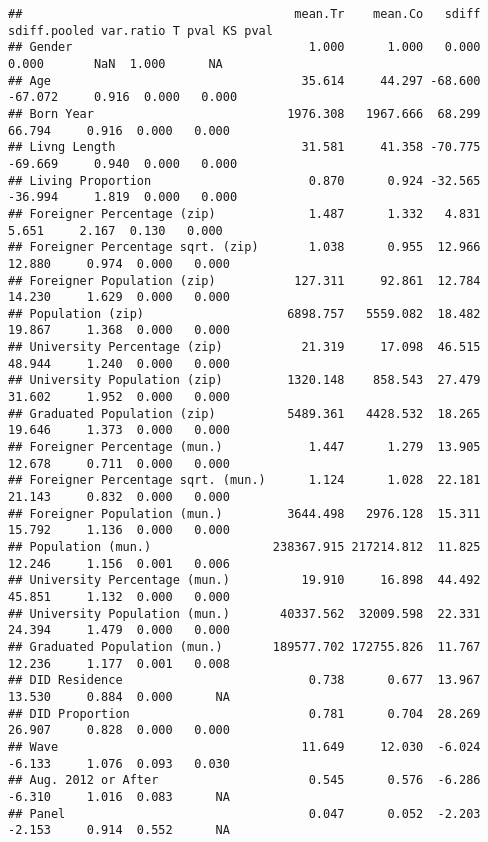 \documentclass[
]{article}
\newenvironment{Shaded}{\begin{snugshade}}{\end{snugshade}}
\newcommand{\CommentTok}[1]{\textcolor[rgb]{0.56,0.35,0.01}{\textit{#1}}}
\newcommand{\DecValTok}[1]{\textcolor[rgb]{0.00,0.00,0.81}{#1}}
\newcommand{\KeywordTok}[1]{\textcolor[rgb]{0.13,0.29,0.53}{\textbf{#1}}}
\newcommand{\NormalTok}[1]{#1}
\newcommand{\OperatorTok}[1]{\textcolor[rgb]{0.81,0.36,0.00}{\textbf{#1}}}
\newcommand{\StringTok}[1]{\textcolor[rgb]{0.31,0.60,0.02}{#1}}
\begin{document}
\begin{Shaded}
\end{Shaded}

\begin{verbatim}
##                                      mean.Tr    mean.Co   sdiff sdiff.pooled var.ratio T pval KS pval
## Gender                                 1.000      1.000   0.000        0.000       NaN  1.000      NA
## Age                                   35.614     44.297 -68.600      -67.072     0.916  0.000   0.000
## Born Year                           1976.308   1967.666  68.299       66.794     0.916  0.000   0.000
## Livng Length                          31.581     41.358 -70.775      -69.669     0.940  0.000   0.000
## Living Proportion                      0.870      0.924 -32.565      -36.994     1.819  0.000   0.000
## Foreigner Percentage (zip)             1.487      1.332   4.831        5.651     2.167  0.130   0.000
## Foreigner Percentage sqrt. (zip)       1.038      0.955  12.966       12.880     0.974  0.000   0.000
## Foreigner Population (zip)           127.311     92.861  12.784       14.230     1.629  0.000   0.000
## Population (zip)                    6898.757   5559.082  18.482       19.867     1.368  0.000   0.000
## University Percentage (zip)           21.319     17.098  46.515       48.944     1.240  0.000   0.000
## University Population (zip)         1320.148    858.543  27.479       31.602     1.952  0.000   0.000
## Graduated Population (zip)          5489.361   4428.532  18.265       19.646     1.373  0.000   0.000
## Foreigner Percentage (mun.)            1.447      1.279  13.905       12.678     0.711  0.000   0.000
## Foreigner Percentage sqrt. (mun.)      1.124      1.028  22.181       21.143     0.832  0.000   0.000
## Foreigner Population (mun.)         3644.498   2976.128  15.311       15.792     1.136  0.000   0.000
## Population (mun.)                 238367.915 217214.812  11.825       12.246     1.156  0.001   0.006
## University Percentage (mun.)          19.910     16.898  44.492       45.851     1.132  0.000   0.000
## University Population (mun.)       40337.562  32009.598  22.331       24.394     1.479  0.000   0.000
## Graduated Population (mun.)       189577.702 172755.826  11.767       12.236     1.177  0.001   0.008
## DID Residence                          0.738      0.677  13.967       13.530     0.884  0.000      NA
## DID Proportion                         0.781      0.704  28.269       26.907     0.828  0.000   0.000
## Wave                                  11.649     12.030  -6.024       -6.133     1.076  0.093   0.030
## Aug. 2012 or After                     0.545      0.576  -6.286       -6.310     1.016  0.083      NA
## Panel                                  0.047      0.052  -2.203       -2.153     0.914  0.552      NA
\end{verbatim}
\end{document}
